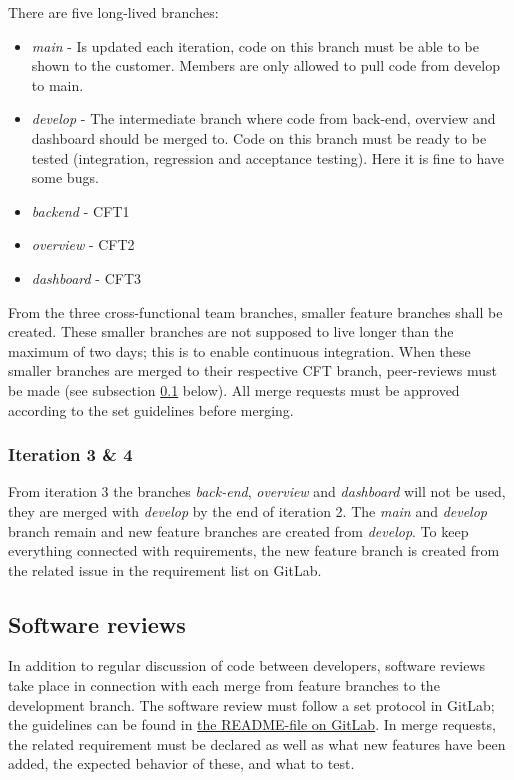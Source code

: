 \noindent There are five long-lived branches:
\begin{itemize}
\item \emph{main} - Is updated each iteration, code on this branch must be able to be shown to the customer. Members are only allowed to pull code from develop to main.
\item \emph{develop} - The intermediate branch where code from back-end, overview and dashboard should be merged to. Code on this branch must be ready to be tested (integration, regression and acceptance testing). Here it is fine to have some bugs.
\item \emph{backend} - CFT1
\item \emph{overview} - CFT2
\item \emph{dashboard} - CFT3
\end{itemize}

\noindent From the three cross-functional team branches, smaller feature branches shall be created. These smaller branches are not supposed to live longer than the maximum of two days; this is to enable continuous integration. When these smaller branches are merged to their respective CFT branch, peer-reviews must be made (see subsection \ref{subsec:reviews} below). 
All merge requests must be approved according to the set guidelines before merging.

\subsubsection*{Iteration 3 \& 4}
From iteration 3 the branches \emph{back-end}, \emph{overview} and \emph{dashboard} will not be used, they are merged with \emph{develop} by the end of iteration 2. The \emph{main} and \emph{develop} branch remain and new feature branches are created from \emph{develop}. To keep everything connected with requirements, the new feature branch is created from the related issue in the requirement list on GitLab.

\subsection{Software reviews}
\label{subsec:reviews}
In addition to regular discussion of code between developers, software reviews take place in connection with each merge from feature branches to the development branch. The software review must follow a set protocol in GitLab; the guidelines can be found in \href{https://gitlab.liu.se/tddc88-company-1-2021/deploy/-/tree/main#merge-requests}{the README-file on GitLab}. In merge requests, the related requirement must be declared as well as what new features have been added, the expected behavior of these, and what to test.

